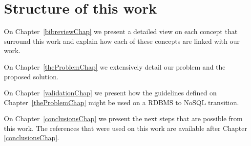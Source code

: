 \section{Structure of this work}

On Chapter~\ref{bibreviewChap} we present a detailed view on each concept that surround this work and explain how each of these concepts are linked with our work. 

On Chapter~\ref{theProblemChap} we extensively detail our problem and the proposed solution.

On Chapter~\ref{validationChap} we present how the guidelines defined on Chapter~\ref{theProblemChap} might be used on a RDBMS to NoSQL transition. 

On Chapter~\ref{conclusionsChap} we present the next steps that are possible from this work. The references that were used on this work are available after Chapter \ref{conclusionsChap}.  